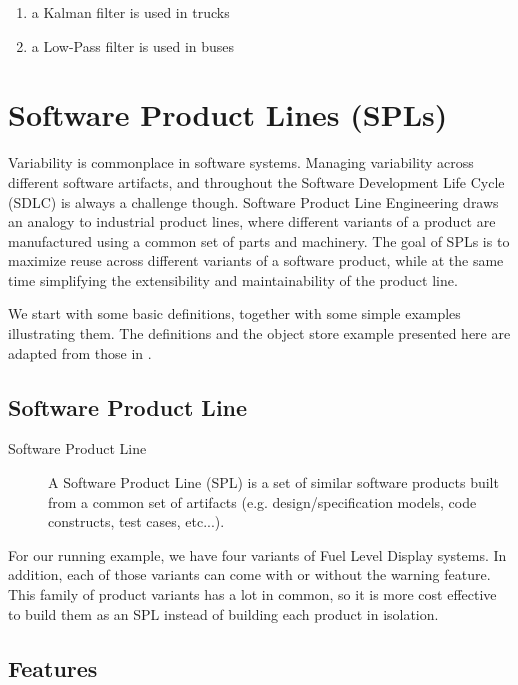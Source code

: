 \documentclass[11pt]{article}
\begin{document}
\begin{enumerate}
\item a Kalman filter is used in trucks
\item a Low-Pass filter is used in buses
\end{enumerate}

\section{Software Product Lines (SPLs)}

Variability is commonplace in software systems. Managing variability across different software artifacts, and throughout the Software Development Life Cycle (SDLC) is always a challenge though. Software Product Line Engineering draws an analogy to industrial product lines, where different variants of a product are manufactured using a common set of parts and machinery. The goal of SPLs is to maximize reuse across different variants of a software product, while at the same time simplifying the extensibility and maintainability of the product line.

We start with some basic definitions, together with some simple examples illustrating them. The definitions and the object store example presented here are adapted from those in \cite{Thum}.

\subsection{Software Product Line}

\begin{description}

\item[Software Product Line]
A Software Product Line (SPL) is a set of similar software products built from a common set of artifacts (e.g. design/specification models, code constructs, test cases, etc...).

\end{description}

For our running example, we have four variants of Fuel Level Display systems. In addition, each of those variants can come with or without the warning feature. This family of product variants has a lot in common, so it is more cost effective to build them as an SPL instead of building each product in isolation.

\subsection{Features}
\end{document}
